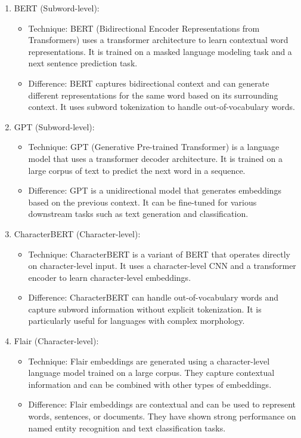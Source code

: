 \begin{enumerate}
\item BERT (Subword-level):
\begin{itemize}
    \item Technique: BERT (Bidirectional Encoder Representations from Transformers) uses a transformer architecture to learn contextual word representations. It is trained on a masked language modeling task and a next sentence prediction task.
    \item Difference: BERT captures bidirectional context and can generate different representations for the same word based on its surrounding context. It uses subword tokenization to handle out-of-vocabulary words.
\end{itemize}

\item GPT (Subword-level):
\begin{itemize}
    \item Technique: GPT (Generative Pre-trained Transformer) is a language model that uses a transformer decoder architecture. It is trained on a large corpus of text to predict the next word in a sequence.
    \item Difference: GPT is a unidirectional model that generates embeddings based on the previous context. It can be fine-tuned for various downstream tasks such as text generation and classification.
\end{itemize}

\item CharacterBERT (Character-level):
\begin{itemize}
    \item Technique: CharacterBERT is a variant of BERT that operates directly on character-level input. It uses a character-level CNN and a transformer encoder to learn character-level embeddings.
    \item Difference: CharacterBERT can handle out-of-vocabulary words and capture subword information without explicit tokenization. It is particularly useful for languages with complex morphology.
\end{itemize}

\item Flair (Character-level):
\begin{itemize}
    \item Technique: Flair embeddings are generated using a character-level language model trained on a large corpus. They capture contextual information and can be combined with other types of embeddings.
    \item Difference: Flair embeddings are contextual and can be used to represent words, sentences, or documents. They have shown strong performance on named entity recognition and text classification tasks.
\end{itemize}
\end{enumerate}

